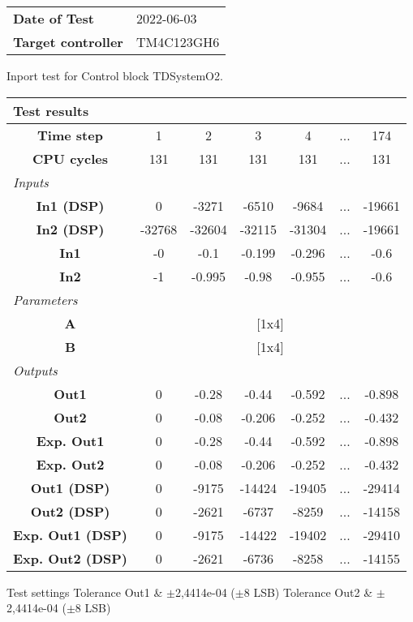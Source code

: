 \begin{tabular}{l l}
\textbf{Date of Test} & 2022-06-03 \tabularnewline
\textbf{Target controller} & TM4C123GH6 \tabularnewline
\end{tabular}
\vspace{1ex}
Inport test for Control block TDSystemO2.

\vspace{1em}
\begin{tabularx}{\textwidth}{|c|c|c|c|c|>{\centering\arraybackslash}X|c|}
\hline
\multicolumn{7}{|l|}{\cellcolor[gray]{0.8}\textbf{Test results}} \tabularnewline \hline
\textbf{Time step} & 1 & 2 & 3 & 4 & ... & 174 \tabularnewline \hline
\textbf{CPU cycles} & 131 & 131 & 131 & 131 & ... & 131 \tabularnewline \hline
\multicolumn{7}{|l|}{\cellcolor[gray]{0.9}\textit{Inputs}} \tabularnewline \hline
\textbf{In1 (DSP)} & 0 & -3271 & -6510 & -9684 & ... & -19661 \tabularnewline \hline
\textbf{In2 (DSP)} & -32768 & -32604 & -32115 & -31304 & ... & -19661 \tabularnewline \hline
\textbf{In1} & -0 & -0.1 & -0.199 & -0.296 & ... & -0.6 \tabularnewline \hline
\textbf{In2} & -1 & -0.995 & -0.98 & -0.955 & ... & -0.6 \tabularnewline \hline
\multicolumn{7}{|l|}{\cellcolor[gray]{0.9}\textit{Parameters}} \tabularnewline \hline
\textbf{A} & \multicolumn{6}{c|}{[1x4]} \tabularnewline \hline
\textbf{B} & \multicolumn{6}{c|}{[1x4]} \tabularnewline \hline
\multicolumn{7}{|l|}{\cellcolor[gray]{0.9}\textit{Outputs}} \tabularnewline \hline
\textbf{Out1} & 0 & -0.28 & -0.44 & -0.592 & ... & -0.898 \tabularnewline \hline
\textbf{Out2} & 0 & -0.08 & -0.206 & -0.252 & ... & -0.432 \tabularnewline \hline
\textbf{Exp. Out1} & 0 & -0.28 & -0.44 & -0.592 & ... & -0.898 \tabularnewline \hline
\textbf{Exp. Out2} & 0 & -0.08 & -0.206 & -0.252 & ... & -0.432 \tabularnewline \hline
\textbf{Out1 (DSP)} & 0 & -9175 & -14424 & -19405 & ... & -29414 \tabularnewline \hline
\textbf{Out2 (DSP)} & 0 & -2621 & -6737 & -8259 & ... & -14158 \tabularnewline \hline
\textbf{Exp. Out1 (DSP)} & 0 & -9175 & -14422 & -19402 & ... & -29410 \tabularnewline \hline
\textbf{Exp. Out2 (DSP)} & 0 & -2621 & -6736 & -8258 & ... & -14155 \tabularnewline \hline
\end{tabularx}
\vspace{1ex}

\begin{XtoCtabular}{Test settings}
Tolerance Out1 & $\pm$2,4414e-04 ($\pm$8 LSB) \tabularnewline \hline
Tolerance Out2 & $\pm$2,4414e-04 ($\pm$8 LSB) \tabularnewline \hline
\end{XtoCtabular}


